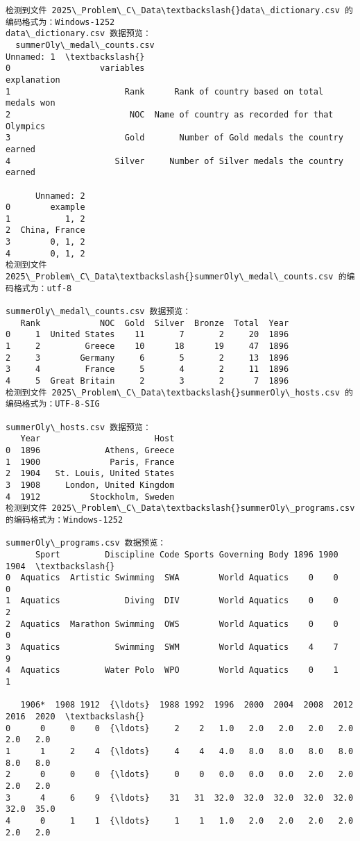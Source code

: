 \documentclass[11pt]{article}
\begin{document}
    \begin{Verbatim}[commandchars=\\\{\}]
检测到文件 2025\_Problem\_C\_Data\textbackslash{}data\_dictionary.csv 的编码格式为：Windows-1252
data\_dictionary.csv 数据预览：
  summerOly\_medal\_counts.csv                                     Unnamed: 1  \textbackslash{}
0                  variables                                    explanation
1                       Rank      Rank of country based on total medals won
2                        NOC  Name of country as recorded for that Olympics
3                       Gold       Number of Gold medals the country earned
4                     Silver     Number of Silver medals the country earned

      Unnamed: 2
0        example
1           1, 2
2  China, France
3        0, 1, 2
4        0, 1, 2
检测到文件 2025\_Problem\_C\_Data\textbackslash{}summerOly\_medal\_counts.csv 的编码格式为：utf-8

summerOly\_medal\_counts.csv 数据预览：
   Rank            NOC  Gold  Silver  Bronze  Total  Year
0     1  United States    11       7       2     20  1896
1     2         Greece    10      18      19     47  1896
2     3        Germany     6       5       2     13  1896
3     4         France     5       4       2     11  1896
4     5  Great Britain     2       3       2      7  1896
检测到文件 2025\_Problem\_C\_Data\textbackslash{}summerOly\_hosts.csv 的编码格式为：UTF-8-SIG

summerOly\_hosts.csv 数据预览：
   Year                       Host
0  1896             Athens, Greece
1  1900              Paris, France
2  1904   St. Louis, United States
3  1908     London, United Kingdom
4  1912          Stockholm, Sweden
检测到文件 2025\_Problem\_C\_Data\textbackslash{}summerOly\_programs.csv 的编码格式为：Windows-1252

summerOly\_programs.csv 数据预览：
      Sport         Discipline Code Sports Governing Body 1896 1900 1904  \textbackslash{}
0  Aquatics  Artistic Swimming  SWA        World Aquatics    0    0    0
1  Aquatics             Diving  DIV        World Aquatics    0    0    2
2  Aquatics  Marathon Swimming  OWS        World Aquatics    0    0    0
3  Aquatics           Swimming  SWM        World Aquatics    4    7    9
4  Aquatics         Water Polo  WPO        World Aquatics    0    1    1

   1906*  1908 1912  {\ldots}  1988 1992  1996  2000  2004  2008  2012  2016  2020  \textbackslash{}
0      0     0    0  {\ldots}     2    2   1.0   2.0   2.0   2.0   2.0   2.0   2.0
1      1     2    4  {\ldots}     4    4   4.0   8.0   8.0   8.0   8.0   8.0   8.0
2      0     0    0  {\ldots}     0    0   0.0   0.0   0.0   2.0   2.0   2.0   2.0
3      4     6    9  {\ldots}    31   31  32.0  32.0  32.0  32.0  32.0  32.0  35.0
4      0     1    1  {\ldots}     1    1   1.0   2.0   2.0   2.0   2.0   2.0   2.0


\end{Verbatim}
\end{document}
